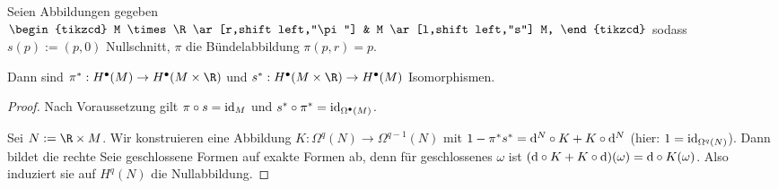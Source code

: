 \begin{st} \label{6.18}
    Seien Abbildungen gegeben
    \begin{math}
        \begin{tikzcd}
            M \times \R \ar[r,shift left,"\pi"] & M \ar[l,shift left,"s"] M,
        \end{tikzcd}
    \end{math}
    sodass $s(p) := (p, 0)$ Nullschnitt, $\pi$ die Bündelabbildung $\pi(p, r) = p$.

    Dann sind $\pi^*: H^\bullet(M) \to H^\bullet(M \times \R)$ und $s^*: H^\bullet(M\times \R) \to H^\bullet(M)$ Isomorphismen.
    \begin{proof}
        Nach Voraussetzung gilt $\pi \circ s = \operatorname{id}_M$ und $s^* \circ \pi^* = \operatorname{id}_{\Omega^\bullet(M)}$.

        Sei $N := \R \times M$.
        Wir konstruieren eine Abbildung
        \begin{math}
            K: \Omega^q(N) \to \Omega^{q-1}(N)
        \end{math}
        mit $1 - \pi^* s^* = \mathrm{d}^N \circ K + K \circ \mathrm{d}^N$ (hier: $1  = \operatorname{id}_{\Omega^q(N)}$).
        Dann bildet die rechte Seie geschlossene Formen auf exakte Formen ab, denn für geschlossenes $\omega$ ist $(\mathrm{d} \circ K + K \circ \mathrm{d})(\omega) = \mathrm{d} \circ K(\omega)$.
        Also induziert sie auf $H^q(N)$ die Nullabbildung.


\end{proof}
\end{st}
